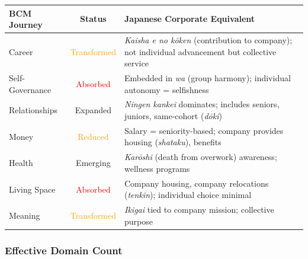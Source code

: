 \begin{center}
\small
\begin{tabular}{@{}lcp{5.5cm}@{}}
\toprule
\textbf{BCM Journey} & \textbf{Status} & \textbf{Japanese Corporate Equivalent} \\
\midrule
Career & \textcolor{orange}{Transformed} & \textit{Kaisha e no kōken} (contribution to company); not individual advancement but collective service \\
Self-Governance & \textcolor{red}{Absorbed} & Embedded in \textit{wa} (group harmony); individual autonomy = selfishness \\
Relationships & \textcolor{green!70!black}{Expanded} & \textit{Ningen kankei} dominates; includes seniors, juniors, same-cohort (\textit{dōki}) \\
Money & \textcolor{orange}{Reduced} & Salary = seniority-based; company provides housing (\textit{shataku}), benefits \\
Health & \textcolor{green!70!black}{Emerging} & \textit{Karōshi} (death from overwork) awareness; wellness programs \\
Living Space & \textcolor{red}{Absorbed} & Company housing, company relocations (\textit{tenkin}); individual choice minimal \\
Meaning & \textcolor{orange}{Transformed} & \textit{Ikigai} tied to company mission; collective purpose \\
\bottomrule
\end{tabular}
\end{center}

\subsubsection{Effective Domain Count}

